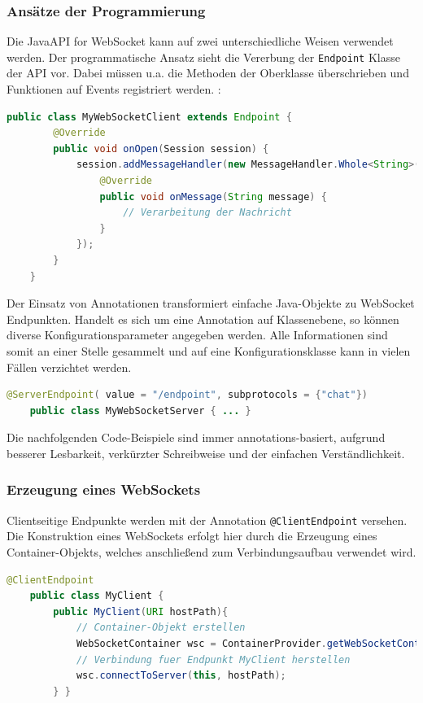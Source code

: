\documentclass[11pt,a4paper,titlepage]{scrartcl}
\numberwithin{equation}{section}
\begin{document}
\subsubsection*{Ansätze der Programmierung}
Die Java\texttrademark API for WebSocket kann auf zwei unterschiedliche Weisen verwendet werden. Der programmatische Ansatz sieht die Vererbung der \texttt{Endpoint} Klasse der API vor. Dabei müssen u.a. die Methoden der Oberklasse überschrieben und Funktionen auf Events registriert werden. \autocite[9]{coward_java_2014}:\smallskip

\begin{lstlisting}[frame=single, language=Java, caption=Java: Programmatischer Ansatz]
	public class MyWebSocketClient extends Endpoint {
		@Override
		public void onOpen(Session session) {
			session.addMessageHandler(new MessageHandler.Whole<String>() {
				@Override
				public void onMessage(String message) {
					// Verarbeitung der Nachricht
				}
			});
		}
	}
\end{lstlisting}

\noindent Der Einsatz von Annotationen transformiert einfache Java-Objekte zu WebSocket Endpunkten. Handelt es sich um eine Annotation auf Klassenebene, so können diverse Konfigurationsparameter angegeben werden. Alle Informationen sind somit an einer Stelle gesammelt und auf eine Konfigurationsklasse kann in vielen Fällen verzichtet werden.\smallskip

\begin{lstlisting}[frame=single, language=Java, caption=Java: Annotationen,label=lst:ServerAnnotation]
	@ServerEndpoint( value = "/endpoint", subprotocols = {"chat"})
	public class MyWebSocketServer { ... }
\end{lstlisting}

\noindent Die nachfolgenden Code-Beispiele sind immer annotations-basiert, aufgrund besserer Lesbarkeit, verkürzter Schreibweise und der einfachen Verständlichkeit. \vspace{-3mm}

\subsubsection*{Erzeugung eines WebSockets}
\noindent Clientseitige Endpunkte werden mit der Annotation \texttt{@ClientEndpoint} versehen. Die Konstruktion eines WebSockets erfolgt hier durch die Erzeugung eines Container-Objekts, welches anschließend zum Verbindungsaufbau verwendet wird.\smallskip

\begin{lstlisting}[frame=single, language=Java, caption=Java Client: Verbindungsaufbau]
	@ClientEndpoint
	public class MyClient {
		public MyClient(URI hostPath){
			// Container-Objekt erstellen
			WebSocketContainer wsc = ContainerProvider.getWebSocketContainer();
			// Verbindung fuer Endpunkt MyClient herstellen
			wsc.connectToServer(this, hostPath);
		} }
\end{lstlisting}
\end{document}
